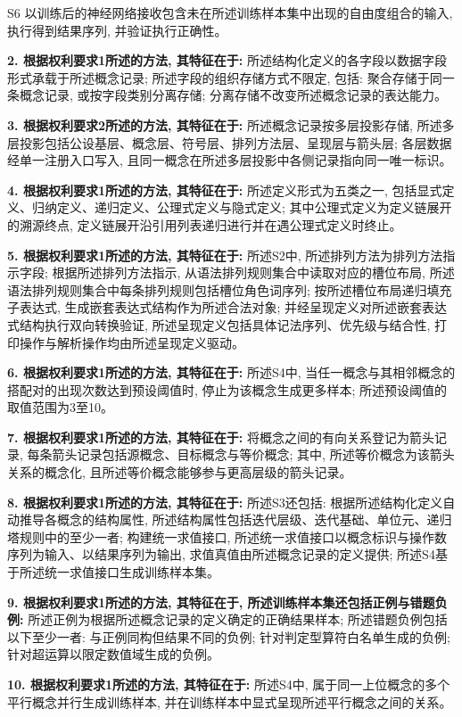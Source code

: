 \documentclass[
]{article}
\begin{document}
S6 以训练后的神经网络接收包含未在所述训练样本集中出现的自由度组合的输入,
执行得到结果序列, 并验证执行正确性。

\textbf{2. 根据权利要求1所述的方法, 其特征在于:}
所述结构化定义的各字段以数据字段形式承载于所述概念记录;
所述字段的组织存储方式不限定, 包括: 聚合存储于同一条概念记录,
或按字段类别分离存储; 分离存储不改变所述概念记录的表达能力。

\textbf{3. 根据权利要求2所述的方法, 其特征在于:}
所述概念记录按多层投影存储,
所述多层投影包括公设基层、概念层、符号层、排列方法层、呈现层与箭头层;
各层数据经单一注册入口写入,
且同一概念在所述多层投影中各侧记录指向同一唯一标识。

\textbf{4. 根据权利要求1所述的方法, 其特征在于:} 所述定义形式为五类之一,
包括显式定义、归纳定义、递归定义、公理式定义与隐式定义;
其中公理式定义为定义链展开的溯源终点,
定义链展开沿引用列表递归进行并在遇公理式定义时终止。

\textbf{5. 根据权利要求1所述的方法, 其特征在于:} 所述S2中,
所述排列方法为排列方法指示字段; 根据所述排列方法指示,
从语法排列规则集合中读取对应的槽位布局,
所述语法排列规则集合中每条排列规则包括槽位角色词序列;
按所述槽位布局递归填充子表达式, 生成嵌套表达式结构作为所述合法对象;
并经呈现定义对所述嵌套表达式结构执行双向转换验证,
所述呈现定义包括具体记法序列、优先级与结合性,
打印操作与解析操作均由所述呈现定义驱动。

\textbf{6. 根据权利要求1所述的方法, 其特征在于:} 所述S4中,
当任一概念与其相邻概念的搭配对的出现次数达到预设阈值时,
停止为该概念生成更多样本; 所述预设阈值的取值范围为3至10。

\textbf{7. 根据权利要求1所述的方法, 其特征在于:}
将概念之间的有向关系登记为箭头记录,
每条箭头记录包括源概念、目标概念与等价概念; 其中,
所述等价概念为该箭头关系的概念化,
且所述等价概念能够参与更高层级的箭头记录。

\textbf{8. 根据权利要求1所述的方法, 其特征在于:} 所述S3还包括:
根据所述结构化定义自动推导各概念的结构属性,
所述结构属性包括迭代层级、迭代基础、单位元、递归塔规则中的至少一者;
构建统一求值接口,
所述统一求值接口以概念标识与操作数序列为输入、以结果序列为输出,
求值真值由所述概念记录的定义提供;
所述S4基于所述统一求值接口生成训练样本集。

\textbf{9. 根据权利要求1所述的方法, 其特征在于,
所述训练样本集还包括正例与错题负例:}
所述正例为根据所述概念记录的定义确定的正确结果样本;
所述错题负例包括以下至少一者: 与正例同构但结果不同的负例;
针对判定型算符白名单生成的负例; 针对超运算以限定数值域生成的负例。

\textbf{10. 根据权利要求1所述的方法, 其特征在于:} 所述S4中,
属于同一上位概念的多个平行概念并行生成训练样本,
并在训练样本中显式呈现所述平行概念之间的关系。
\end{document}
